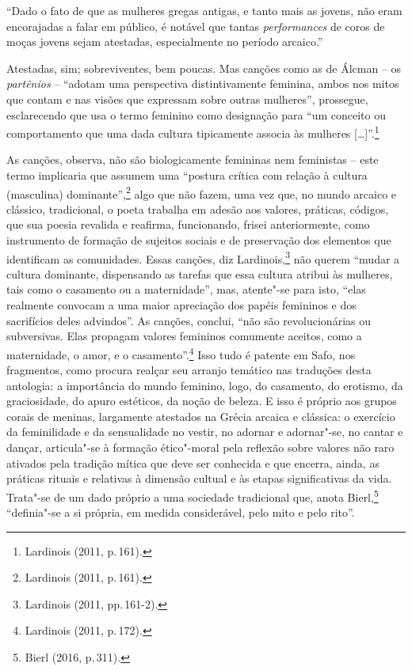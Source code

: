 ``Dado o fato de que as mulheres gregas antigas, e tanto mais as jovens, não eram encorajadas a falar em público, é notável que tantas \textit{performances} de coros de moças jovens sejam atestadas, especialmente no período arcaico.''

Atestadas, sim; sobreviventes, bem poucas. Mas canções como as de Álcman -- os \textit{partênios} -- ``adotam uma perspectiva distintivamente feminina, ambos nos mitos que contam e nas visões que expressam sobre outras mulheres'', prossegue, esclarecendo que usa o termo feminino como designação para ``um conceito ou comportamento que uma dada cultura tipicamente associa às mulheres [\ldots{}]''.\footnote{Lardinois (2011, p.\,161).}

As canções, observa, não são biologicamente femininas nem feministas -- este termo implicaria que assumem uma “postura crítica com relação à cultura (masculina) dominante”,\footnote{Lardinois (2011, p.\,161).} algo que não fazem, uma vez que, no mundo arcaico e clássico, tradicional, o poeta trabalha em adesão aos valores, práticas, códigos, que sua poesia revalida e reafirma, funcionando, frisei anteriormente, como instrumento de formação de sujeitos sociais e de preservação dos elementos que identificam as comunidades. Essas canções, diz Lardinois,\footnote{Lardinois (2011, pp.\,161-2).} não querem “mudar a cultura dominante, dispensando as tarefas que essa cultura atribui às mulheres, tais como o casamento ou a maternidade”, mas, atente"-se para isto, “elas realmente convocam a uma maior apreciação dos papéis femininos e dos sacrifícios deles advindos”. As canções, conclui, “não são revolucionárias ou subversivas. Elas propagam valores femininos comumente aceitos, como a maternidade, o amor, e o casamento”.\footnote{Lardinois (2011, p.\,172).} Isso tudo é patente em Safo, nos fragmentos, como procura realçar seu arranjo temático nas traduções desta antologia: a importância do mundo feminino, logo, do casamento, do erotismo, da graciosidade, do apuro estéticos, da noção de beleza. E isso é próprio aos grupos corais de meninas, largamente atestados na Grécia arcaica e clássica: o exercício da feminilidade e da sensualidade no vestir, no adornar e adornar"-se, no cantar e dançar, articula"-se à formação ético"-moral pela reflexão sobre valores não raro ativados pela tradição mítica que deve ser conhecida e que encerra, ainda, as práticas rituais e relativas à dimensão cultual e às etapas significativas da vida. Trata"-se de um dado próprio a uma sociedade tradicional que, anota Bierl,\footnote{Bierl (2016, p.\,311).} “definia"-se a si própria, em medida considerável, pelo mito e pelo rito”. 


